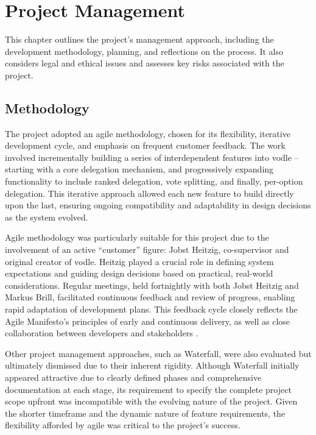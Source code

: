 \chapter{Project Management}\label{ch:project_management}

This chapter outlines the project's management approach, including the development methodology, planning, and reflections on the process. It also considers legal and ethical issues and assesses key risks associated with the project.

\section{Methodology}
The project adopted an agile methodology, chosen for its flexibility, iterative development cycle, and emphasis on frequent customer feedback. The work involved incrementally building a series of interdependent features into vodle -- starting with a core delegation mechanism, and progressively expanding functionality to include ranked delegation, vote splitting, and finally, per-option delegation. This iterative approach allowed each new feature to build directly upon the last, ensuring ongoing compatibility and adaptability in design decisions as the system evolved.

Agile methodology was particularly suitable for this project due to the involvement of an active ``customer'' figure: Jobst Heitzig, co-supervisor and original creator of vodle. Heitzig played a crucial role in defining system expectations and guiding design decisions based on practical, real-world considerations. Regular meetings, held fortnightly with both Jobst Heitzig and Markus Brill, facilitated continuous feedback and review of progress, enabling rapid adaptation of development plans. This feedback cycle closely reflects the Agile Manifesto's principles of early and continuous delivery, as well as close collaboration between developers and stakeholders \citep{agilemanifesto2001}.

Other project management approaches, such as Waterfall, were also evaluated but ultimately dismissed due to their inherent rigidity. Although Waterfall initially appeared attractive due to clearly defined phases and comprehensive documentation at each stage, its requirement to specify the complete project scope upfront was incompatible with the evolving nature of the project. Given the shorter timeframe and the dynamic nature of feature requirements, the flexibility afforded by agile was critical to the project's success.

